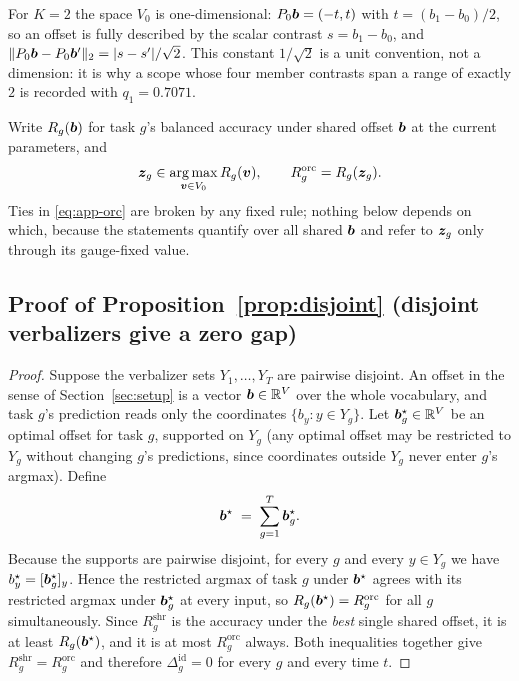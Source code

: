 For $K=2$ the space $V_0$ is one-dimensional: $P_0\bm{b}=(-t,t)$ with
$t=(b_1-b_0)/2$, so an offset is fully described by the scalar contrast
$s=b_1-b_0$, and $\|P_0\bm{b}-P_0\bm{b}'\|_2=|s-s'|/\sqrt2$. This constant $1/\sqrt2$ is
a unit convention, not a dimension: it is why a scope whose four member contrasts
span a range of exactly $2$ is recorded with $q_1=0.7071$.

Write $R_g(\bm{b})$ for task $g$'s balanced accuracy under shared offset $\bm{b}$ at the
current parameters, and
\begin{equation}
  \bm{z}_g \in \operatorname*{arg\,max}_{\bm{v}\in V_0} R_g(\bm{v}),
  \qquad
  R_g^{\mathrm{orc}} = R_g(\bm{z}_g).
  \label{eq:app-orc}
\end{equation}
Ties in \eqref{eq:app-orc} are broken by any fixed rule; nothing below depends on
which, because the statements quantify over all shared $\bm{b}$ and refer to $\bm{z}_g$
only through its gauge-fixed value.

\subsection{Proof of Proposition~\ref{prop:disjoint} (disjoint verbalizers give a zero gap)}
\label{app:proof-disjoint}

\begin{proof}
Suppose the verbalizer sets $Y_1,\dots,Y_T$ are pairwise disjoint. An offset in
the sense of Section~\ref{sec:setup} is a vector $\bm{b}\in\mathbb{R}^{V}$ over the whole
vocabulary, and task $g$'s prediction reads only the coordinates $\{b_y:y\in Y_g\}$.
Let $\bm{b}_g^\star\in\mathbb{R}^{V}$ be an optimal offset for task $g$, supported on $Y_g$
(any optimal offset may be restricted to $Y_g$ without changing $g$'s predictions,
since coordinates outside $Y_g$ never enter $g$'s argmax). Define
\begin{equation}
  \bm{b}^\star \;=\; \sum_{g=1}^{T}\bm{b}_g^\star .
  \label{eq:app-disjoint-sum}
\end{equation}
Because the supports are pairwise disjoint, for every $g$ and every $y\in Y_g$ we
have $b^\star_y = [\bm{b}_g^\star]_y$. Hence the restricted argmax of task $g$ under
$\bm{b}^\star$ agrees with its restricted argmax under $\bm{b}_g^\star$ at every input,
so $R_g(\bm{b}^\star)=R_g^{\mathrm{orc}}$ for all $g$ simultaneously. Since
$R_g^{\mathrm{shr}}$ is the accuracy under the \emph{best} single shared offset, it
is at least $R_g(\bm{b}^\star)$, and it is at most $R_g^{\mathrm{orc}}$ always. Both
inequalities together give $R_g^{\mathrm{shr}}=R_g^{\mathrm{orc}}$ and therefore
$\Delta_g^{\mathrm{id}}=0$ for every $g$ and every time $t$.
\end{proof}

